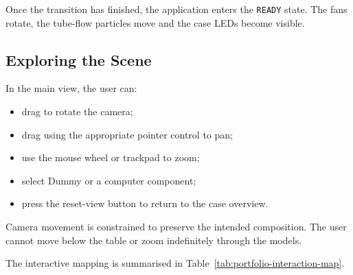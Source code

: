 \documentclass{report}
\begin{document}
Once the transition has finished, the application enters the
\texttt{READY} state. The fans rotate, the tube-flow particles move and
the case LEDs become visible.

\subsection{Exploring the Scene}

In the main view, the user can:

\begin{itemize}
    \item drag to rotate the camera;
    \item drag using the appropriate pointer control to pan;
    \item use the mouse wheel or trackpad to zoom;
    \item select Dummy or a computer component;
    \item press the reset-view button to return to the case overview.
\end{itemize}

Camera movement is constrained to preserve the intended composition.
The user cannot move below the table or zoom indefinitely through the
models.

The interactive mapping is summarised in
Table~\ref{tab:portfolio-interaction-map}.
\end{document}
